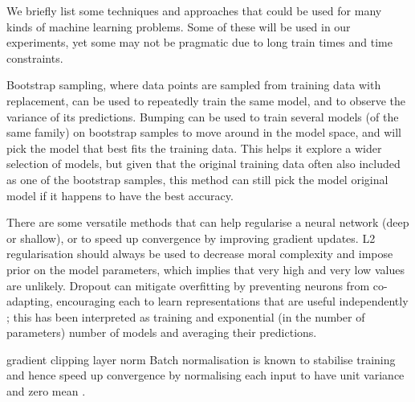 We briefly list some techniques and approaches that could be used for many kinds of machine learning problems.
Some of these will be used in our experiments, yet some may not be pragmatic due to long train times and time constraints.

Bootstrap sampling, where data points are sampled from training data with replacement, can be used to repeatedly train the same model, and to observe the variance of its predictions.
Bumping can be used to train several models (of the same family) on bootstrap samples to move around in the model space, and will pick the model that best fits the training data.
This helps it explore a wider selection of models, but given that the original training data often also included as one of the bootstrap samples, this method  can still pick the model original model if it happens to have the best accuracy.

There are some versatile methods that can help regularise a neural network (deep or shallow), or to speed up convergence by improving  gradient updates.
L2  regularisation should always be used to decrease moral complexity and impose prior on the model parameters, which  implies that very high and very low values are unlikely.
Dropout can mitigate overfitting by preventing neurons from co-adapting, encouraging each to learn representations that are useful independently \cite{dropout}; this has been interpreted as training and exponential (in the number of parameters) number of models and averaging their predictions.

gradient clipping
layer norm
Batch normalisation is known to stabilise training and hence speed up convergence  by normalising each input to have unit variance and zero mean \cite{batch_norm}.
